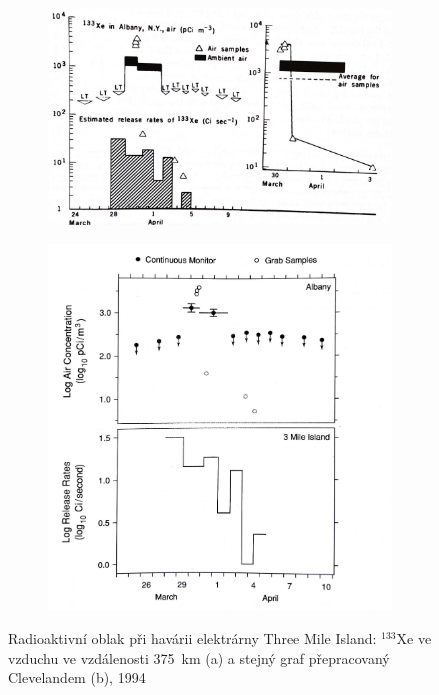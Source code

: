 \documentclass[12pt,]{article}
\begin{document}
\begin{figure}[H]
  \begin{subfigure}{0.57\textwidth}
  \centering
    \vspace*{0.65cm}
      \includegraphics[width=\textwidth]{fig/cleveland_xenon_133}
      \vspace*{0.2cm}
      \caption{}
      \label{fig:ch1.7a}
  \end{subfigure}%
  \begin{subfigure}[H]{0.43\textwidth}
  \centering
      \includegraphics[width=\textwidth]{fig/cleveland_xenon_opr}
      \vspace*{-0.8cm}
      \caption{}
      \label{fig:ch1.7b}
  \end{subfigure}
\vspace*{-0.25cm}
\caption{Radioaktivní oblak při havárii elektrárny Three Mile Island: ${}^{133}\mbox{Xe}$ ve vzduchu ve vzdálenosti \SI{375}{\kilo\meter} (a) a stejný graf přepracovaný Clevelandem (b), 1994} 
\label{fig:ch1.7}
\end{figure}
\end{document}
